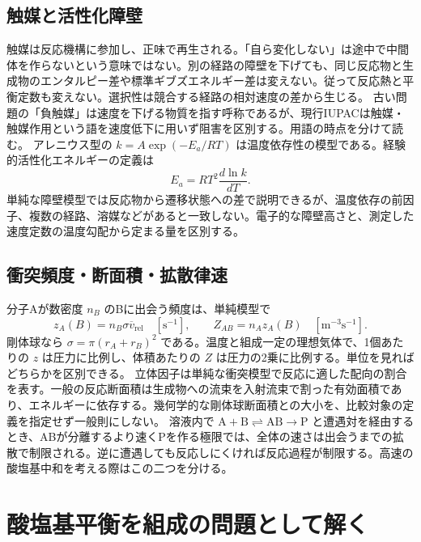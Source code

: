 \subsection{触媒と活性化障壁}
\label{theory:chem_eq:catalyst}
触媒は反応機構に参加し、正味で再生される。「自ら変化しない」は途中で中間体を作らないという意味ではない。別の経路の障壁を下げても、同じ反応物と生成物のエンタルピー差や標準ギブズエネルギー差は変えない。従って反応熱と平衡定数も変えない。選択性は競合する経路の相対速度の差から生じる。
古い問題の「負触媒」は速度を下げる物質を指す呼称であるが、現行IUPACは触媒・触媒作用という語を速度低下に用いず阻害を区別する。用語の時点を分けて読む。\cite{iupac_catalyst}
\label{theory:chem_eq:activation}
アレニウス型の \(k=A\exp(-E_a/RT)\) は温度依存性の模型である。経験的活性化エネルギーの定義は
\[
E_a=RT^2\frac{d\ln k}{dT}.
\]
単純な障壁模型では反応物から遷移状態への差で説明できるが、温度依存の前因子、複数の経路、溶媒などがあると一致しない。電子的な障壁高さと、測定した速度定数の温度勾配から定まる量を区別する。\cite{iupac_greenbook2012,mit_kinetics2013}

\subsection{衝突頻度・断面積・拡散律速}
\label{theory:chem_eq:collision}
分子Aが数密度 \(n_B\) のBに出会う頻度は、単純模型で
\[
z_A(B)=n_B\sigma\overline v_{\mathrm{rel}}\quad[\mathrm{s^{-1}}],\qquad
Z_{AB}=n_Az_A(B)\quad[\mathrm{m^{-3}s^{-1}}].
\]
剛体球なら \(\sigma=\pi(r_A+r_B)^2\) である。温度と組成一定の理想気体で、1個あたりの \(z\) は圧力に比例し、体積あたりの \(Z\) は圧力の2乗に比例する。単位を見ればどちらかを区別できる。
立体因子は単純な衝突模型で反応に適した配向の割合を表す。一般の反応断面積は生成物への流束を入射流束で割った有効面積であり、エネルギーに依存する。幾何学的な剛体球断面積との大小を、比較対象の定義を指定せず一般則にしない。\cite{iupac_greenbook2012}
\label{theory:chem_eq:diffusion}
溶液内で \(\mathrm{A+B\rightleftharpoons AB\to P}\) と遭遇対を経由するとき、ABが分離するより速くPを作る極限では、全体の速さは出会うまでの拡散で制限される。逆に遭遇しても反応しにくければ反応過程が制限する。高速の酸塩基中和を考える際はこの二つを分ける。

\section{酸塩基平衡を組成の問題として解く}
